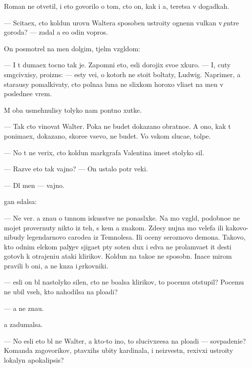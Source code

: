 \documentclass[10pt]{book}
\begin{document}
Roman ne otvetil, i eto govorilo o tom, cto on, kak i {\y}a, ter{\ia}{\y}etsa v dogadkah.

— Scita{\y}ex, cto koldun urovn{\ia} Waltera sposoben ustro{\y}ity ognenn{\yi}{\y} vulkan v {\c}entre goroda? — zadal {\y}a {\y}e{\x}o odin vopros.

On posmotrel na men{\ia} dolgim, t{\ia}jel{\yi}m vzgl{\ia}dom:

— I t{\yi} duma{\y}ex tocno tak je. Zapomni eto, {\y}esli dorojix svo{\y}e{\y} xkuro{\y}. — I, cuty sm{\ia}gcivxisy, proizn{\e}s: — {\Y}esty ve{\x}i, o kotor{\yi}h ne sto{\y}it boltaty, Ludwig. Naprimer, {\y}a stara{\y}usy pomalkivaty, cto polna{\y}a luna ne slixkom horoxo vli{\y}a{\y}et na men{\ia} v posledne{\y}e vrem{\ia}.

M{\yi} oba usmehnulisy tolyko nam pon{\ia}tno{\y} xutke.

— Tak cto vinovat Walter. Poka ne budet dokazano obratno{\y}e. A ono, kak t{\yi} ponima{\y}ex, dokazano, skore{\y}e vsevo, ne budet. Vo vs{\ia}kom sluca{\y}e, tolpe.

— No t{\yi} ne verix, cto koldun markgrafa Valentina ime{\y}et stolyko sil.

— Razve eto tak vajno? — On ustalo pot{\e}r veki.

— Dl{\ia} men{\ia} — vajno.

{\C}{\yi}gan sdalsa:

— Ne ver{\iu}. {\Y}a zna{\y}u o t{\e}mnom iskusstve ne ponasl{\yi}xke. Na mo{\y} vzgl{\ia}d, podobno{\y}e ne mojet provernuty nikto iz teh, s kem {\y}a znakom. Zdesy nujna mo{\x} velefa ili kakovo-nibudy legendarnovo carode{\y}a iz Temnoles{\y}a. Ili oceny ser{\y}oznovo demona. Takovo, kto odnim {\x}elckom paly{\c}ev sjiga{\y}et p{\ia}ty soten dux i {\y}edva ne prolam{\yi}va{\y}et {\x}it des{\ia}ti gotov{\yi}h k otrajeni{\y}u ataki klirikov. Koldun{\yi} na tako{\y}e ne sposobn{\yi}. Inace mirom pravili b{\yi} oni, a ne kn{\ia}z{\y}a i {\c}erkovniki.

— {\Y}esli on b{\yi}l nastolyko silen, cto ne bo{\y}alsa klirikov, to pocemu otstupil? Pocemu ne ubil vseh, kto nahodilsa na plo{\x}adi?

— {\Y}a ne zna{\y}u.

{\Y}a zadumalsa.

— No {\y}esli eto b{\yi}l ne Walter, a kto-to ino{\y}, to slucivxe{\y}esa na plo{\x}adi — sovpadeni{\y}e? Komanda zagovor{\x}ikov, p{\yi}tavxihs{\ia} ubity kardinala, i neizvestn{\yi}{\y}, rexivxi{\y} ustro{\y}ity lokalyn{\yi}{\y} apokalipsis?
\end{document}
